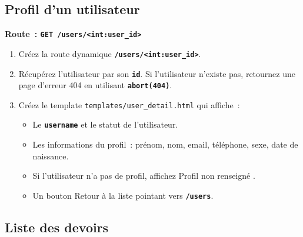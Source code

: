 \documentclass[12pt,a4paper]{article}
\newcommand{\fichier}[1]{\texttt{\textcolor{primary}{#1}}}
\newcommand{\kw}[1]{\texttt{\textbf{#1}}}
\begin{document}
\subsection{Profil d'un utilisateur}

\begin{mdframed}[style=exercice]
\textbf{Route~: \texttt{GET /users/<int:user\_id>}}

\begin{enumerate}[label=\textbf{\arabic*.}]
    \item Créez la route dynamique \kw{/users/<int:user\_id>}.
    \item Récupérez l'utilisateur par son \kw{id}. Si l'utilisateur n'existe pas, retournez une page d'erreur 404 en utilisant \kw{abort(404)}.
    \item Créez le template \fichier{templates/user\_detail.html} qui affiche~:
    \begin{itemize}
        \item Le \kw{username} et le statut de l'utilisateur.
        \item Les informations du profil~: prénom, nom, email, téléphone, sexe, date de naissance.
        \item Si l'utilisateur n'a pas de profil, affichez \og Profil non renseigné \fg{}.
        \item Un bouton \og Retour à la liste \fg{} pointant vers \kw{/users}.
    \end{itemize}
\end{enumerate}
\end{mdframed}

\subsection{Liste des devoirs}
\end{document}

